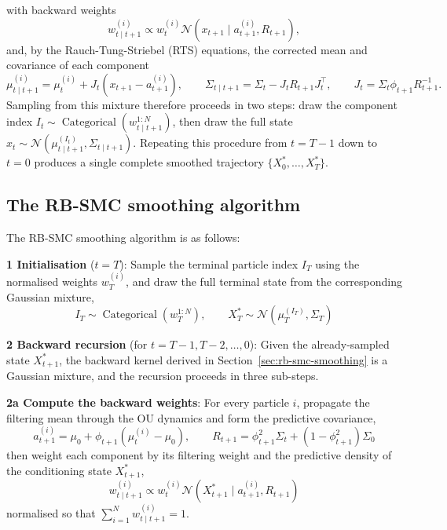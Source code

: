 with backward weights
\begin{equation}
w_{t \mid t+1}^{(i)} \propto w_t^{(i)} \mathcal{N}(x_{t+1} \mid a_{t+1}^{(i)}, R_{t+1}),
\end{equation}
and, by the Rauch-Tung-Striebel (RTS) equations, the corrected mean and covariance of each component
\begin{equation}
\mu_{t \mid t+1}^{(i)} = \mu_t^{(i)} + J_t \left( x_{t+1} - a_{t+1}^{(i)} \right), \qquad \Sigma_{t \mid t+1} = \Sigma_t - J_t R_{t+1} J_t^\top, \qquad J_t = \Sigma_t \phi_{t+1} R_{t+1}^{-1}.
\end{equation}
Sampling from this mixture therefore proceeds in two steps: draw the component index $I_t \sim \operatorname{Categorical}(w_{t \mid t+1}^{1:N})$, then draw the full state $x_t \sim \mathcal{N}(\mu_{t \mid t+1}^{(I_t)}, \Sigma_{t \mid t+1})$. Repeating this procedure from $t = T-1$ down to $t = 0$ produces a single complete smoothed trajectory $\{X_0^*, \dots, X_T^*\}$.

\subsection{The RB-SMC smoothing algorithm}

The RB-SMC smoothing algorithm is as follows:

\textbf{1 Initialisation} ($t = T$): Sample the terminal particle index $I_T$ using the normalised weights $w_T^{(i)}$, and draw the full terminal state from the corresponding Gaussian mixture,
\begin{equation*}
    I_T \sim \operatorname{Categorical}(w_T^{1:N}), \qquad X_T^* \sim \mathcal{N}(\mu_T^{(I_T)}, \Sigma_T)
\end{equation*}

\textbf{2 Backward recursion} (for $t = T-1, T-2, \dots, 0$): Given the already-sampled state $X_{t+1}^*$, the backward kernel derived in Section~\ref{sec:rb-smc-smoothing} is a Gaussian mixture, and the recursion proceeds in three sub-steps.

\textbf{2a Compute the backward weights}: For every particle $i$, propagate the filtering mean through the OU dynamics and form the predictive covariance,
\begin{equation*}
    a_{t+1}^{(i)} = \mu_0 + \phi_{t+1}(\mu_t^{(i)} - \mu_0), \qquad R_{t+1} = \phi_{t+1}^2 \Sigma_t + (1 - \phi_{t+1}^2) \Sigma_0
\end{equation*}
then weight each component by its filtering weight and the predictive density of the conditioning state $X_{t+1}^*$,
\begin{equation*}
    w_{t \mid t+1}^{(i)} \propto w_t^{(i)} \mathcal{N}\left( X_{t+1}^* \mid a_{t+1}^{(i)}, R_{t+1} \right)
\end{equation*}
normalised so that $\sum_{i=1}^N w_{t \mid t+1}^{(i)} = 1$.

